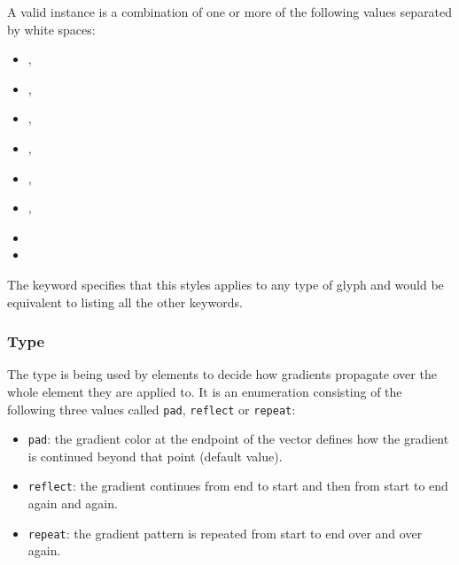 A valid \StyleType instance is a combination of one or more of the following 
values separated by white spaces:

\begin{itemize}
 \item {},
 \item {},
 \item {}, 
 \item {},
 \item {}, 
 \item {}, 
 \item {} 
 \item {}
\end{itemize}

The  keyword specifies that this styles applies to any type of glyph and 
would be equivalent to listing all the other keywords. 

\subsubsection{Type \fixttspace{}}

The type \GradientSpreadMethod is being used by \GradientBase elements to decide how 
gradients propagate over the whole element they are applied to. It is an enumeration consisting 
of the following three values called \texttt{pad}, \texttt{reflect} or \texttt{repeat}:

\begin{itemize}
 \item {\texttt{pad}:} the gradient color at the
endpoint of the vector defines how the gradient is continued beyond that point (default value).
 \item {\texttt{reflect}:} the gradient continues from end to start and
then from start to end again and again.
 \item {\texttt{repeat}:} the gradient pattern is repeated from start to end over and over again.
\end{itemize}

